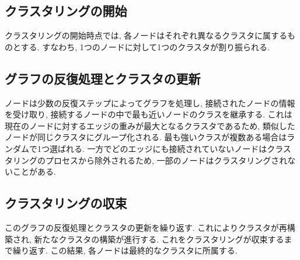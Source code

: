 \subsection{クラスタリングの開始}
クラスタリングの開始時点では, 各ノードはそれぞれ異なるクラスタに属するものとする. すなわち, 1つのノードに対して1つのクラスタが割り振られる. 

\subsection{グラフの反復処理とクラスタの更新}
ノードは少数の反復ステップによってグラフを処理し, 接続されたノードの情報を受け取り, 接続するノードの中で最も近いノードのクラスを継承する. これは現在のノードに対するエッジの重みが最大となるクラスタであるため, 類似したノードが同じクラスタにグループ化される. 最も強いクラスが複数ある場合はランダムで1つ選ばれる. 一方でどのエッジにも接続されていないノードはクラスタリングのプロセスから除外されるため, 一部のノードはクラスタリングされないことがある. 

\subsection{クラスタリングの収束}
このグラフの反復処理とクラスタの更新を繰り返す. これによりクラスタが再構築され, 新たなクラスタの構築が進行する. これをクラスタリングが収束するまで繰り返す. この結果, 各ノードは最終的なクラスタに所属する. 